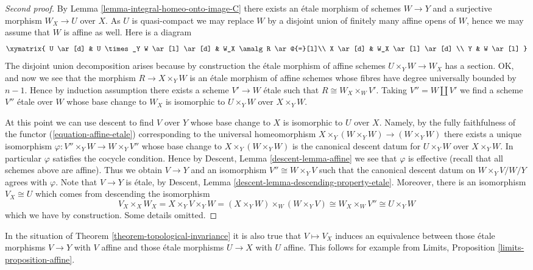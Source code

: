 \begin{proof}[Second proof]
\medskip\noindent
By
Lemma \ref{lemma-integral-homeo-onto-image-C}
there exists an \'etale morphism of schemes $W \to Y$ and a
surjective morphism $W_X \to U$ over $X$.
As $U$ is quasi-compact we may replace $W$ by a disjoint union of
finitely many affine opens of $W$, hence we may assume that $W$
is affine as well. Here is a diagram
$$
\xymatrix{
U \ar[d] & U \times_Y W \ar[l] \ar[d] & W_X \amalg R \ar@{=}[l]\\
X \ar[d] & W_X \ar[l] \ar[d] \\
Y & W \ar[l]
}
$$
The disjoint union decomposition arises because by construction the
\'etale morphism of affine schemes $U \times_Y W \to W_X$ has a section.
OK, and now we see that the morphism $R \to X \times_Y W$ is an \'etale
morphism of affine schemes whose fibres have degree universally bounded
by $n - 1$. Hence by induction assumption there exists a scheme
$V' \to W$ \'etale such that $R \cong W_X \times_W V'$.
Taking $V'' = W \amalg V'$ we find a scheme $V''$ \'etale over $W$ whose
base change to $W_X$ is isomorphic to $U \times_Y W$
over $X \times_Y W$.

\medskip\noindent
At this point we can use descent to find $V$ over $Y$ whose base
change to $X$ is isomorphic to $U$ over $X$. Namely, by the fully
faithfulness of the functor (\ref{equation-affine-etale})
corresponding to the universal homeomorphism
$X \times_Y (W \times_Y W) \to (W \times_Y W)$
there exists a unique isomorphism $\varphi : V'' \times_Y W \to W \times_Y V''$
whose base change to $X \times_Y (W \times_Y W)$ is the canonical
descent datum for $U \times_Y W$ over $X \times_Y W$. In particular
$\varphi$ satisfies the cocycle condition. Hence by
Descent, Lemma \ref{descent-lemma-affine}
we see that $\varphi$ is effective (recall that all schemes above are affine).
Thus we obtain $V \to Y$ and an isomorphism $V'' \cong W \times_Y V$
such that the canonical descent datum on $W \times_Y V/W/Y$ agrees
with $\varphi$. Note that $V \to Y$ is \'etale, by
Descent, Lemma \ref{descent-lemma-descending-property-etale}.
Moreover, there is an isomorphism $V_X \cong U$ which comes from
descending the isomorphism
$$
V_X \times_X W_X =
X \times_Y V \times_Y W =
(X \times_Y W) \times_W (W \times_Y V) \cong
W_X  \times_W V'' \cong U \times_Y W
$$
which we have by construction. Some details omitted.
\end{proof}

\begin{remark}
\label{remark-affine-inside-equivalence}
In the situation of
Theorem \ref{theorem-topological-invariance}
it is also true that $V \mapsto V_X$ induces an equivalence
between those \'etale morphisms $V \to Y$ with $V$ affine and
those \'etale morphisms $U \to X$ with $U$ affine.
This follows for example from
Limits, Proposition \ref{limits-proposition-affine}.
\end{remark}

